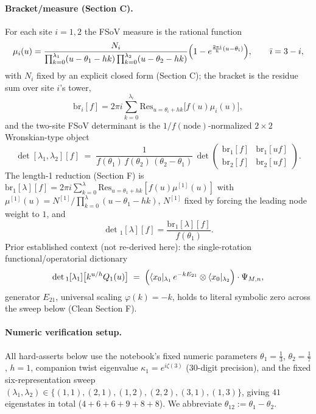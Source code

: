\documentclass[11pt]{article}
\begin{document}
\paragraph{Bracket/measure (Section C).} For each site $i=1,2$ the FSoV measure is the rational
function
\begin{equation}
  \mu_i(u) = \frac{N_i}{\prod_{k=0}^{\lambda_1}(u-\theta_1-hk)\prod_{k=0}^{\lambda_2}(u-\theta_2-hk)}
  \Bigl(1-e^{\frac{2\pi i}{h}(u-\theta_{\bar\imath})}\Bigr), \qquad \bar\imath = 3-i,
  \label{eq:mu}
\end{equation}
with $N_i$ fixed by an explicit closed form (Section C); the bracket is the residue sum over site
$i$'s tower,
\begin{equation}
  \mathrm{br}_i[f] = 2\pi i\sum_{k=0}^{\lambda_i} \mathrm{Res}_{u=\theta_i+hk}\bigl[f(u)\mu_i(u)\bigr],
  \label{eq:br}
\end{equation}
and the two-site FSoV determinant is the $1/f(\text{node})$-normalized $2\times2$ Wronskian-type
object
\begin{equation}
  \det[\lambda_1,\lambda_2][f] \;=\; \frac{1}{f(\theta_1)\,f(\theta_2)\,(\theta_2-\theta_1)}\,
  \det\!\begin{pmatrix} \mathrm{br}_1[f] & \mathrm{br}_1[uf] \\ \mathrm{br}_2[f] & \mathrm{br}_2[uf]
  \end{pmatrix}.
  \label{eq:det}
\end{equation}
The length-1 reduction (Section F) is $\mathrm{br}_1[\lambda][f] = 2\pi i\sum_{k=0}^\lambda
\mathrm{Res}_{u=\theta_1+hk}[f(u)\mu^{[1]}(u)]$ with $\mu^{[1]}(u)=N^{[1]}/\prod_{k=0}^\lambda
(u-\theta_1-hk)$, $N^{[1]}$ fixed by forcing the leading node weight to $1$, and
\begin{equation}
  \det{}_1[\lambda][f] = \frac{\mathrm{br}_1[\lambda][f]}{f(\theta_1)}.
  \label{eq:det1}
\end{equation}
Prior established context (not re-derived here): the single-rotation functional/operatorial
dictionary
\begin{equation}
  \det{}_1[\lambda_1]\bigl[k^{u/h}Q_1(u)\bigr] \;=\;
  \Bigl(\langle x_0|_{\lambda_1}\,e^{-kE_{21}}\otimes\langle x_0|_{\lambda_2}\Bigr)\cdot\Psi_{M,n},
  \label{eq:single-dict}
\end{equation}
generator $E_{21}$, universal scaling $\varphi(k)=-k$, holds to literal symbolic zero across the
sweep below (Clean Section F).

\paragraph{Numeric verification setup.} All hard-asserts below use the notebook's fixed numeric
parameters $\theta_1=\tfrac13$, $\theta_2=\tfrac17$, $h=1$, companion twist eigenvalue
$\kappa_1=e^{i\zeta(3)}$ (30-digit precision), and the fixed six-representation sweep
$(\lambda_1,\lambda_2)\in\{(1,1),(2,1),(1,2),(2,2),(3,1),(1,3)\}$, giving $41$ eigenstates in total
($4+6+6+9+8+8$). We abbreviate $\theta_{12}:=\theta_1-\theta_2$.
\end{document}
